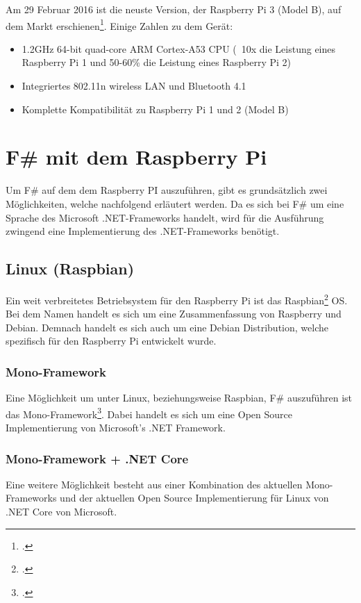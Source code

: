 
Am 29 Februar 2016 ist die neuste Version, der Raspberry Pi 3 (Model B), auf dem Markt erschienen\footcite{Raspberry_Pi_3_2016-04-24}. Einige Zahlen zu dem Gerät:

\begin{itemize}
\item 1.2GHz 64-bit quad-core ARM Cortex-A53 CPU (~10x die Leistung eines Raspberry Pi 1 und 50-60\% die Leistung eines Raspberry Pi 2)
\item Integriertes 802.11n wireless LAN und Bluetooth 4.1
\item Komplette Kompatibilität zu Raspberry Pi 1 und 2 (Model B)
\end{itemize} 


\section{F\# mit dem Raspberry Pi}
\label{sec:recherche:fsharprpi}
Um F\# auf dem dem Raspberry PI auszuführen, gibt es grundsätzlich zwei Möglichkeiten, welche nachfolgend erläutert werden.
Da es sich bei F\# um eine Sprache des Microsoft .NET-Frameworks handelt, wird für die Ausführung zwingend eine Implementierung des .NET-Frameworks benötigt.

\subsection{Linux (Raspbian)}
Ein weit verbreitetes Betriebsystem für den Raspberry Pi ist das Raspbian\footcite{FrontPage_-_Raspbian_2016-04-24} OS. Bei dem Namen handelt es sich um eine Zusammenfassung von Raspberry und Debian. Demnach handelt es sich auch um eine Debian Distribution, welche spezifisch für den Raspberry Pi entwickelt wurde.

\subsubsection{Mono-Framework}
Eine Möglichkeit um unter Linux, beziehungsweise Raspbian, F\# auszuführen ist das Mono-Framework\footcite{Mono_2016-04-24}. Dabei handelt es sich um eine Open Source Implementierung von Microsoft's .NET Framework.

\subsubsection{Mono-Framework + .NET Core}
Eine weitere Möglichkeit besteht aus einer Kombination des aktuellen Mono-Frameworks und der aktuellen Open Source Implementierung für Linux von .NET Core von Microsoft.



